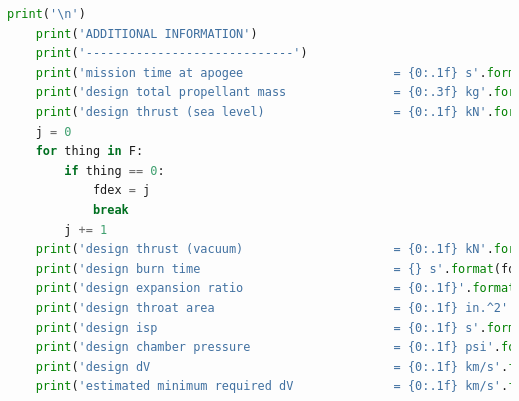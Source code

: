 \documentclass[]{aiaa-tc}%
\begin{document}
\begin{lstlisting}[language=Python]
    print('\n')
    print('ADDITIONAL INFORMATION')
    print('-----------------------------')
    print('mission time at apogee                     = {0:.1f} s'.format(t[-1]))
    print('design total propellant mass               = {0:.3f} kg'.format(m_prop[0]))
    print('design thrust (sea level)                  = {0:.1f} kN'.format(F[0]/1000))
    j = 0
    for thing in F:
        if thing == 0:
            fdex = j
            break
        j += 1
    print('design thrust (vacuum)                     = {0:.1f} kN'.format(F[fdex - 1]/1000))
    print('design burn time                           = {} s'.format(fdex))
    print('design expansion ratio                     = {0:.1f}'.format(ex))
    print('design throat area                         = {0:.1f} in.^2'.format(A_t/0.0254**2))
    print('design isp                                 = {0:.1f} s'.format(Ve/9.81))
    print('design chamber pressure                    = {0:.1f} psi'.format(p_ch))
    print('design dV                                  = {0:.1f} km/s'.format(dV1))
    print('estimated minimum required dV              = {0:.1f} km/s'.format( sqrt(2*9.81*alt[-1])/1000))
\end{lstlisting}
\end{document}

